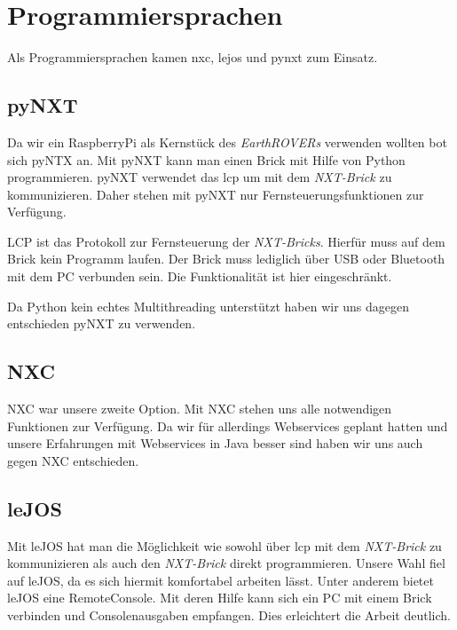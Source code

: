 \chapter{Programmiersprachen}
Als Programmiersprachen kamen \gls{nxc}, \gls{lejos} und \gls{pynxt} zum Einsatz. 

\section{pyNXT}
Da wir ein RaspberryPi als Kernstück des \textit{EarthROVERs} verwenden wollten bot sich pyNTX an. Mit pyNXT kann man einen Brick mit Hilfe von Python programmieren. pyNXT verwendet das \gls{lcp} um mit dem \textit{NXT-Brick} zu kommunizieren. Daher stehen mit pyNXT nur Fernsteuerungsfunktionen zur Verfügung.

LCP ist das Protokoll zur Fernsteuerung der \textit{NXT-Bricks}. Hierfür muss auf dem Brick kein Programm laufen. Der Brick muss lediglich über USB oder Bluetooth mit dem PC verbunden sein. Die Funktionalität ist hier eingeschränkt.

Da Python kein echtes Multithreading unterstützt haben wir uns dagegen entschieden pyNXT zu verwenden.

\section{NXC}
NXC war unsere zweite Option. Mit NXC stehen uns alle notwendigen Funktionen zur Verfügung. Da wir für allerdings Webservices geplant hatten und unsere Erfahrungen mit Webservices in Java besser sind haben wir uns auch gegen NXC entschieden.

\section{leJOS}
Mit leJOS hat man die Möglichkeit wie sowohl über \gls{lcp} mit dem \textit{NXT-Brick} zu kommunizieren als auch den \textit{NXT-Brick} direkt programmieren. Unsere Wahl fiel auf leJOS, da es sich hiermit komfortabel arbeiten lässt. Unter anderem bietet leJOS eine RemoteConsole. Mit deren Hilfe kann sich ein PC mit einem Brick verbinden und Consolenausgaben empfangen. Dies erleichtert die Arbeit deutlich.
